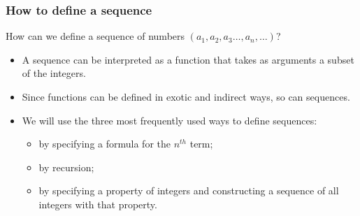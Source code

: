 \begin{frame}
\frametitle{How to define a sequence}
\begin{question}
How can we define a sequence of numbers $\left(a_1, a_2, a_3 \dots, a_n, \dots \right)$?
\end{question}
\begin{itemize}
\item A sequence can be interpreted as a function that takes as arguments a subset of the integers. 
\item Since functions can be defined in exotic and indirect ways, so can sequences. 
\item We will use the three most frequently used ways to define sequences:
\begin{itemize}
\item by specifying a formula for the $n^{th}$ term;
\item by recursion;
\item by specifying a property of integers and constructing a sequence of all integers with that property.
\end{itemize}
\end{itemize}
\end{frame}
